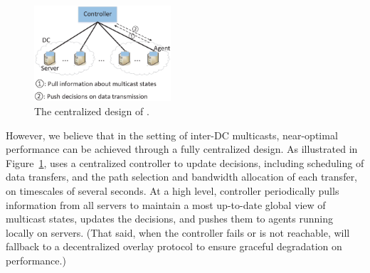 \begin{figure}[t]
  \centering
  \includegraphics[width=2in]{images/framework.eps}
  \caption{The centralized design of \name.}
  \label{fig:framework}
\vspace{-0.4cm}
\end{figure}

However, we believe that in the setting of inter-DC
multicasts, near-optimal performance can be achieved
through a fully centralized design.
As illustrated in Figure~\ref{fig:framework}, 
\name uses a centralized controller to update decisions,
including scheduling of data transfers, and the path selection and
bandwidth allocation of each transfer, on timescales of
several seconds.
At a high level, \name controller periodically pulls information
from all servers to maintain a most up-to-date global view of
multicast states, updates the decisions, and pushes them
to agents running locally on servers.
(That said, when the controller fails or is
not reachable, \name will fallback to a decentralized
overlay protocol to ensure graceful degradation on performance.)

